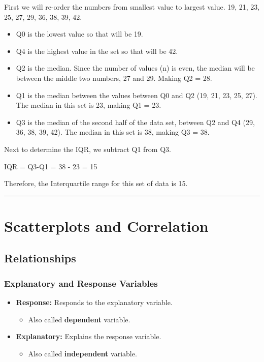 \documentclass[
  letterpaper,
  DIV=11,
  numbers=noendperiod,
  oneside]{scrreprt}
\providecommand{\tightlist}{%
  \setlength{\itemsep}{0pt}\setlength{\parskip}{0pt}}\usepackage{longtable,booktabs,array}
\begin{document}
First we will re-order the numbers from smallest value to largest value.
19, 21, 23, 25, 27, 29, 36, 38, 39, 42.

\begin{itemize}
\tightlist
\item
  Q0 is the lowest value so that will be 19.
\item
  Q4 is the highest value in the set so that will be 42.
\item
  Q2 is the median. Since the number of values (n) is even, the median
  will be between the middle two numbers, 27 and 29. Making Q2 = 28.
\item
  Q1 is the median between the values between Q0 and Q2 (19, 21, 23, 25,
  27). The median in this set is 23, making Q1 = 23.
\item
  Q3 is the median of the second half of the data set, between Q2 and Q4
  (29, 36, 38, 39, 42). The median in this set is 38, making Q3 = 38.
\end{itemize}

Next to determine the IQR, we subtract Q1 from Q3.

IQR = Q3-Q1 = 38 - 23 = 15

Therefore, the Interquartile range for this set of data is 15.

\begin{center}\rule{0.5\linewidth}{0.5pt}\end{center}

\hypertarget{scatterplots-and-correlation}{%
\chapter{Scatterplots and
Correlation}\label{scatterplots-and-correlation}}

\hypertarget{relationships}{%
\section{Relationships}\label{relationships}}

\hypertarget{explanatory-and-response-variables}{%
\subsection{Explanatory and Response
Variables}\label{explanatory-and-response-variables}}

\begin{itemize}
\tightlist
\item
  \textbf{Response:} Responds to the explanatory variable.

  \begin{itemize}
  \tightlist
  \item
    Also called \textbf{dependent} variable.
  \end{itemize}
\item
  \textbf{Explanatory:} Explains the response variable.

  \begin{itemize}
  \tightlist
  \item
    Also called \textbf{independent} variable.
  \end{itemize}
\end{itemize}
\end{document}
